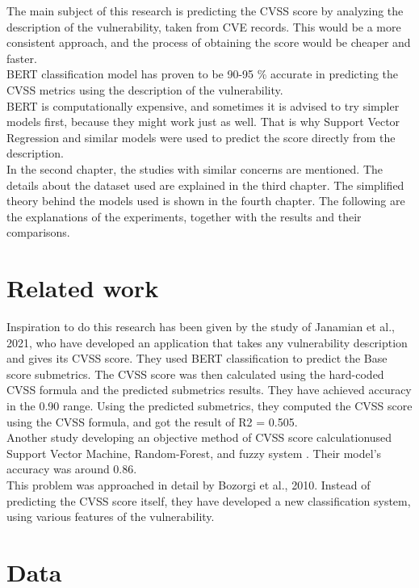 \documentclass[times, utf8, zavrsni, english]{fer}
\begin{document}
\noindent The main subject of this research is predicting the CVSS score by analyzing the description of the vulnerability, taken from CVE records. This would be a more consistent approach, and the process of obtaining the score would be cheaper and faster. \\
BERT classification model has proven to be 90-95 \% accurate in predicting the CVSS metrics using the description of the vulnerability. \\
BERT is computationally expensive, and sometimes it is advised to try simpler models first, because they might work just as well. That is why Support Vector Regression and similar models were used to predict the score directly from the description.\\

\noindent In the second chapter, the studies with similar concerns are mentioned. The details about the dataset used are explained in the third chapter. The simplified theory behind the models used is shown in the fourth chapter. The following are the explanations of the experiments, together with the results and their comparisons. 

\chapter{Related work}
Inspiration to do this research has been given by the study of Janamian et al., 2021, who have developed an application that takes any vulnerability description and gives its CVSS score. They used BERT classification to predict the Base score submetrics. The CVSS score was then calculated using the hard-coded CVSS formula and the predicted submetrics results. They have achieved accuracy in the 0.90 range. Using the predicted submetrics, they computed the CVSS score using the CVSS formula, and got the result of R2 = 0.505.\\

\noindent Another study developing an objective method of CVSS score calculationused Support Vector Machine, Random-Forest, and fuzzy system \citep{khazaei}. Their model's accuracy was around 0.86. \\

\noindent This problem was approached in detail by Bozorgi et al., 2010.  Instead of predicting the CVSS score itself, they have developed a new classification system, using various features of the vulnerability. \\

\chapter{Data}
\end{document}
